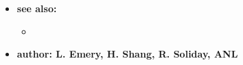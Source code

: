 \begin{itemize}
\item {\bf see also:}
  \begin{itemize}
  \item {}
  \end{itemize}

\item {\bf author: L. Emery, H. Shang, R. Soliday, ANL}
\end{itemize}
